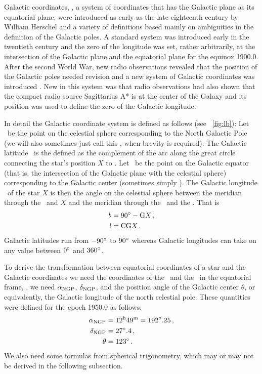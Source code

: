 Galactic coordinates, \ie, a system of coordinates that has the
Galactic plane as its equatorial plane, were introduced as early as
the late eighteenth century by William Herschel and a variety of
definitions based mainly on ambiguities in the definition of the
Galactic poles. A standard system was introduced early in the
twentieth century \citep{Ohlsson32a} and the zero of the longitude was
set, rather arbitrarily, at the intersection of the Galactic plane and
the equatorial plane for the equinox 1900.0. After the second World
War, new radio observations revealed that the position of the Galactic
poles needed revision and a new system of Galactic coordinates was
introduced \citep{1960MNRAS.121..123B}. New in this system was that
radio observations had also shown that the compact radio source
Sagittarius A* is at the center of the Galaxy and its position was
used to define the zero of the Galactic longitude.

In detail the Galactic coordinate system is defined as follows (see
\figurename~\ref{fig:lb}): Let \ngp\ be the point on the celestial
sphere corresponding to the North Galactic Pole (we will also
sometimes just call this \ngpg, when brevity is required). The
Galactic latitude \galb\ is the defined as the complement of the arc
along the great circle connecting the star's position $X$ to \ngp. Let
\gc\ be the point on the Galactic equator (that is, the intersection
of the Galactic plane with the celestial sphere) corresponding to the
Galactic center (sometimes simply \gcc). The Galactic longitude
\gall\ of the star $X$ is then the angle on the celestial sphere
between the meridian through the \ngp\ and $X$ and the meridian
through the \ngp\ and the \gc. That is
\begin{align}\label{eq:galcodef}
{\it b} &= 90^{\circ} - \textnormal{G} X \, ,\\
{\it l} &= \textnormal{C} \textnormal{G} X \, .
\end{align}
Galactic latitudes run from $-90^{\circ}$ to $90^{\circ}$ whereas Galactic
longitudes can take on any value between $0^{\circ}$ and $360^{\circ}$.

To derive the transformation between equatorial coordinates of a star
and the Galactic coordinates we need the coordinates of the \ngp\ and
the \gc\ in the equatorial frame, \ie, we need $\alpha_{\textnormal{NGP}}$, $\delta_{\textnormal{NGP}}$,
and the position angle of the Galactic center $\theta$, or
equivalently, the Galactic longitude of the north celestial
pole. These quantities were defined for the epoch 1950.0 as follows:
\citep{1960MNRAS.121..123B}
\begin{align}\label{eq:IAUNGPGC}
\alpha_{\textnormal{NGP}} &= 12^{\textnormal{h}}49^{\textnormal{m}} = 192^{\circ}.25\, ,\\
\delta_{\textnormal{NGP}} &= 27^{\circ}.4\, ,\\
\theta &= 123^{\circ}\, .
\end{align}
We also need some formulas from spherical trigonometry, which may or
may not be derived in the following subsection.

